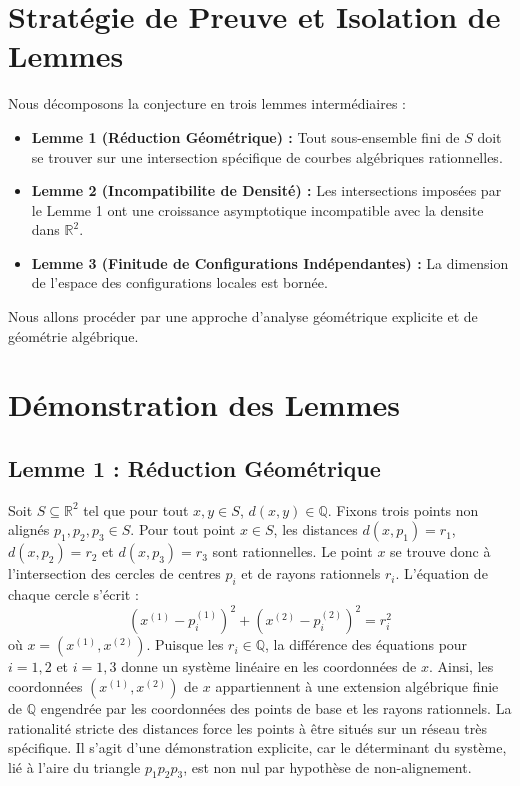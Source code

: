 \documentclass[12pt, a4paper]{article}
\begin{document}
\section{Stratégie de Preuve et Isolation de Lemmes}
Nous décomposons la conjecture en trois lemmes intermédiaires :
\begin{itemize}
    \item \textbf{Lemme 1 (Réduction Géométrique) :} Tout sous-ensemble fini de $S$ doit se trouver sur une intersection spécifique de courbes algébriques rationnelles.
    \item \textbf{Lemme 2 (Incompatibilite de Densité) :} Les intersections imposées par le Lemme 1 ont une croissance asymptotique incompatible avec la densite dans $\mathbb{R}^2$.
    \item \textbf{Lemme 3 (Finitude de Configurations Indépendantes) :} La dimension de l'espace des configurations locales est bornée.
\end{itemize}

Nous allons procéder par une approche d'analyse géométrique explicite et de géométrie algébrique.

\section{Démonstration des Lemmes}

\subsection{Lemme 1 : Réduction Géométrique}
Soit $S \subseteq \mathbb{R}^2$ tel que pour tout $x, y \in S$, $d(x, y) \in \mathbb{Q}$.
Fixons trois points non alignés $p_1, p_2, p_3 \in S$. Pour tout point $x \in S$, les distances $d(x, p_1) = r_1$, $d(x, p_2) = r_2$ et $d(x, p_3) = r_3$ sont rationnelles.
Le point $x$ se trouve donc à l'intersection des cercles de centres $p_i$ et de rayons rationnels $r_i$. L'équation de chaque cercle s'écrit :
\[ (x^{(1)} - p_i^{(1)})^2 + (x^{(2)} - p_i^{(2)})^2 = r_i^2 \]
où $x = (x^{(1)}, x^{(2)})$.
Puisque les $r_i \in \mathbb{Q}$, la différence des équations pour $i=1, 2$ et $i=1, 3$ donne un système linéaire en les coordonnées de $x$.
Ainsi, les coordonnées $(x^{(1)}, x^{(2)})$ de $x$ appartiennent à une extension algébrique finie de $\mathbb{Q}$ engendrée par les coordonnées des points de base et les rayons rationnels. La rationalité stricte des distances force les points à être situés sur un réseau très spécifique.
Il s'agit d'une démonstration explicite, car le déterminant du système, lié à l'aire du triangle $p_1p_2p_3$, est non nul par hypothèse de non-alignement.
\end{document}
